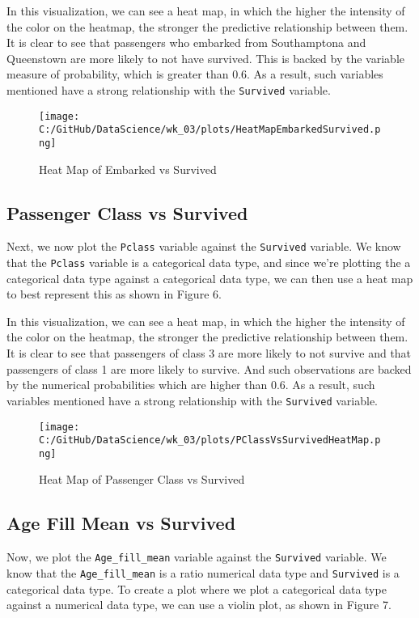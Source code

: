 \documentclass[a4paper, twocolumn]{article}
\begin{document}
In this visualization, we can see a heat map, in which the higher the intensity of the color on the heatmap, the 
stronger the predictive relationship between them. It is clear to see that passengers who embarked from Southamptona
and Queenstown are more likely to not have survived. This is backed by the variable measure of probability, which
is greater than 0.6. As a result, such variables mentioned have a strong relationship with the \texttt{Survived}
variable.

\begin{figure}[h!] 
    \centering
    \noindent
    \texttt{[image: C:/GitHub/DataScience/wk\_03/plots/HeatMapEmbarkedSurvived.png]}  
    \caption{Heat Map of Embarked vs Survived} 
\end{figure}

\subsection{Passenger Class vs Survived}
Next, we now plot the \texttt{Pclass} variable against the \texttt{Survived} variable. We know that the 
\texttt{Pclass} variable is a categorical data type, and since we're plotting the a categorical data type against
a categorical data type, we can then use a heat map to best represent this as shown in Figure 6.

In this visualization, we can see a heat map, in which the higher the intensity of the color on the heatmap, the 
stronger the predictive relationship between them. It is clear to see that passengers of class 3 are more likely 
to not survive and that passengers of class 1 are more likely to survive. And such observations are backed by 
the numerical probabilities which are higher than 0.6. As a result, such variables mentioned have a strong 
relationship with the \texttt{Survived} variable.

\begin{figure}[h!] 
    \centering
    \noindent
    \texttt{[image: C:/GitHub/DataScience/wk\_03/plots/PClassVsSurvivedHeatMap.png]}  
    \caption{Heat Map of Passenger Class vs Survived} 
\end{figure}

\subsection{Age Fill Mean vs Survived}
Now, we plot the \texttt{Age\_fill\_mean} variable against the \texttt{Survived} variable. We know that the 
\texttt{Age\_fill\_mean} is a ratio numerical data type and \texttt{Survived} is a categorical data type.
To create a plot where we plot a categorical data type against a numerical data type, we can use a violin plot, as
shown in Figure 7.
\end{document}

